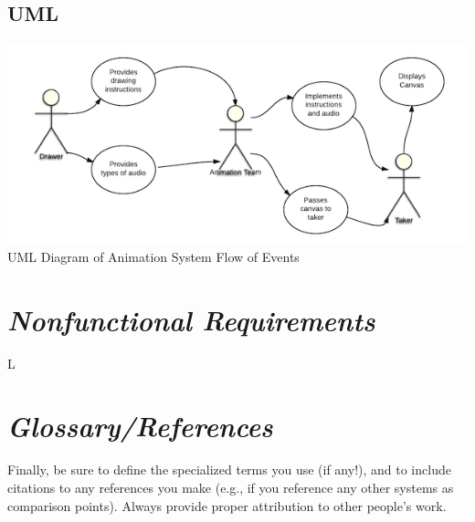 \documentclass[12pt]{article}
\begin{document}
	

\subsection{UML}
\includegraphics[scale=.7]{UML.png}
UML Diagram of Animation System Flow of Events


\section{\emph{Nonfunctional Requirements}}
L

\section{\emph{Glossary/References}}
Finally, be sure to define the specialized terms you use (if any!), and to include citations to any references you make (e.g., if you reference any other systems as comparison points). Always provide proper attribution to other people's work.
\end{document}
